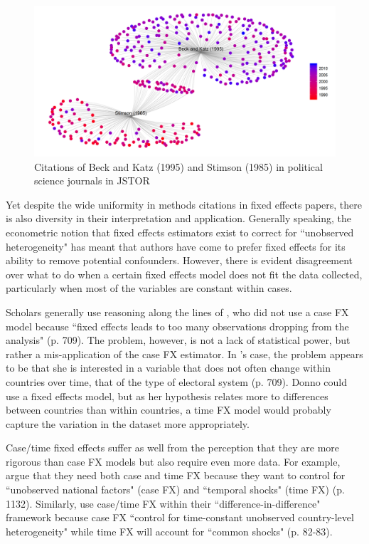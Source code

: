 \documentclass{article}[12pt]
\begin{document}
\begin{figure}
	\centering
	\includegraphics[width=\linewidth]{stimsonkatz}
	\caption{Citations of Beck and Katz (1995) and Stimson (1985) in political science journals in JSTOR}\label{stimsonkatz}
\end{figure}

Yet despite the wide uniformity in methods citations in fixed effects papers, there is also diversity in their interpretation and application. Generally speaking, the econometric notion that fixed effects estimators exist to correct for ``unobserved heterogeneity" \parencite{arellano2003} has meant that authors have come to prefer fixed effects for its ability to remove potential confounders. However, there is evident disagreement over what to do when a certain fixed effects model does not fit the data collected, particularly when most of the variables are constant within cases.

Scholars generally use reasoning along the lines of \textcite{donno2013}, who did not use a case FX model because ``fixed effects leads to too many observations dropping from the analysis" (p. 709). The problem, however, is not a lack of statistical power, but rather a mis-application of the case FX estimator. In \citeauthor{donno2013}'s case, the problem appears to be that she is interested in a variable that does not often change within countries over time, that of the type of electoral system (p. 709). Donno could use a fixed effects model, but as her hypothesis relates more to differences between countries than within countries, a time FX model would probably capture the variation in the dataset more appropriately.

Case/time fixed effects suffer as well from the perception that they are more rigorous than case FX models but also require even more data. For example, \textcite{gabel2012} argue that they need both case and time FX because they want to control for ``unobserved national factors" (case FX) and ``temporal shocks" (time FX) (p. 1132). Similarly, \textcite{scheve2012} use case/time FX within their ``difference-in-difference" framework because case FX ``control for time-constant unobserved country-level heterogeneity" while time FX will account for ``common shocks" (p. 82-83).
\end{document}

